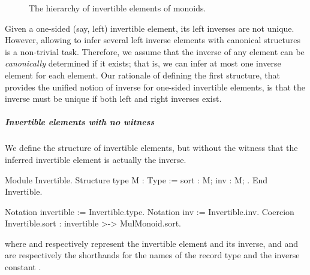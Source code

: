 \documentclass[a4paper,UKenglish,cleveref,autoref]{lipics-v2021}
\begin{document}
\begin{figure}
  \centering
  \caption{The hierarchy of invertible elements of monoids.}
  \label{fig:invertible-hierarchy}
\end{figure}

Given a one-sided (say, left) invertible element, its left inverses are not unique. However,
allowing to infer several left inverse elements with canonical structures is a non-trivial task.
Therefore, we assume that the inverse of any element can be \emph{canonically} determined if it
exists; that is, we can infer at most one inverse element for each element.
Our rationale of defining the first structure, that provides the unified notion of inverse for
one-sided invertible elements, is that the inverse must be unique if both left and right inverses
exist.

\subparagraph{Invertible elements with no witness}
We define the structure of invertible elements, but without the witness that the inferred invertible
element is actually the inverse.
\begin{rocqcode}
Module Invertible.
Structure type M : Type := { sort : M; inv : M; }.
End Invertible.

Notation invertible := Invertible.type.
Notation inv := Invertible.inv.
Coercion Invertible.sort : invertible >-> MulMonoid.sort.
\end{rocqcode}
where  and  respectively represent the invertible element and its inverse, and
 and  are respectively the shorthands for the names of the record type
 and the inverse constant .
\end{document}

